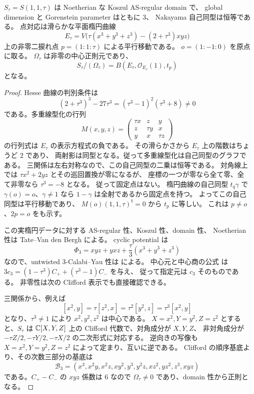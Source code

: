 \begin{lemma}[実楕円因子と指定中心元]
\label{eco:lem:clifford-input}
$S_\tau=S(1,1,\tau)$ は Noetherian な Koszul AS-regular domain で、
global dimension と Gorenstein parameter はともに $3$、
Nakayama 自己同型は恒等である。
点対応は滑らかな平面楕円曲線
\[
 E_\tau=V\bigl(\tau(x^3+y^3+z^3)-(2+\tau^3)xyz\bigr)
\]
上の非零二捩れ点 $p=(1:1:\tau)$ による平行移動である。
$o=(1:-1:0)$ を原点に取る。
$\Omega_\tau$ は非零の中心正則元であり、
\[
 S_\tau/(\Omega_\tau)
   =B(E_\tau,\mathcal O_{E_\tau}(1),t_p)
\]
となる。
\end{lemma}

\begin{proof}
Hesse 曲線の判別条件は
\[
 (2+\tau^3)^3-27\tau^3=(\tau^3-1)^2(\tau^3+8)\ne0
\]
である。多重線型化の行列
\[
 M(x,y,z)=
 \begin{pmatrix}\tau x&z&y\\z&\tau y&x\\y&x&\tau z\end{pmatrix}
\]
の行列式は $E_\tau$ の表示方程式の負である。
その滑らかさから $E_\tau$ 上の階数はちょうど $2$ であり、
両射影は同型となる。従って多重線型化は自己同型のグラフである。
三関係は左右対称なので、この自己同型の二乗は恒等である。
対角線上では $\tau x^2+2yz$ とその巡回置換が零になるが、
座標の一つが零なら全て零、全て非零なら $\tau^3=-8$ となる。
従って固定点はない。
楕円曲線の自己同型 $t_q\gamma$ で $\gamma(o)=o$、$\gamma\ne1$ なら
$1-\gamma$ は全射であるから固定点を持つ。
よってこの自己同型は平行移動であり、
$M(o)(1,1,\tau)^{\mathsf t}=0$ から $t_p$ に等しい。
これは $p\ne o$、$2p=o$ をも示す。

この実楕円データに対する AS-regular 性、Koszul 性、domain 性、
Noetherian 性は Tate--Van den Bergh
\cite[Theorem~1.1, Corollary~1.3 and Section~4.1]{GRSklyaninTV}による。
cyclic potential は
\[
 \Phi_3=xyz+yxz+\frac\tau3(x^3+y^3+z^3)
\]
なので、untwisted $3$-Calabi--Yau 性は
\cite[Corollary~2.9]{MoriSmith}による。
中心元と中心商の公式
\cite[Sections~1--2]{GRSklyaninDLL}は
$3c_3=(1-\tau^3)C_++(\tau^3-1)C_-$ を与え、
従って指定元は $c_3$ そのものである。
非零性は次の Clifford 表示でも直接確認できる。

三関係から、例えば
\[
 [x^2,y]=\tau[z^2,x]=\tau^2[y^2,z]
          =\tau^3[x^2,y]
\]
となり、$\tau^3\ne1$ により $x^2,y^2,z^2$ は中心である。
$X=x^2,Y=y^2,Z=z^2$ とすると、$S_\tau$ は
$\mathbb C[X,Y,Z]$ 上の Clifford 代数で、対角成分が $X,Y,Z$、
非対角成分が $-\tau Z/2,-\tau Y/2,-\tau X/2$ の二次形式に対応する。
逆向きの写像も $X=x^2,Y=y^2,Z=z^2$ によって定まり、互いに逆である。
Clifford の順序基底より、その次数三部分の基底は
\begin{equation}\label{eco:eq:degree-three-basis}
 \mathscr B_3=(x^3,x^2y,x^2z,xy^2,y^3,y^2z,xz^2,yz^2,z^3,xyz)
\end{equation}
である。$C_+-C_-$ の $xyz$ 係数は $6$ なので
$\Omega_\tau\ne0$ であり、domain 性から正則となる。
\end{proof}

